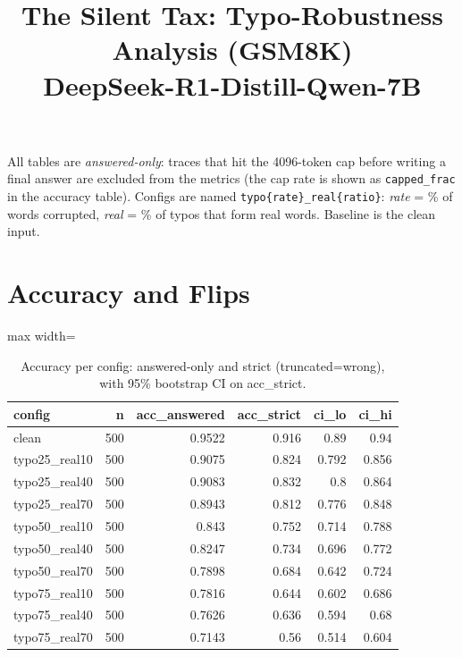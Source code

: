 \documentclass[11pt]{article}
\title{The Silent Tax: Typo-Robustness Analysis (GSM8K)\\\large DeepSeek-R1-Distill-Qwen-7B}
\date{}
\begin{document}
\maketitle
\noindent All tables are \emph{answered-only}: traces that hit the 4096-token cap before writing a final answer are excluded from the metrics (the cap rate is shown as \texttt{capped\_frac} in the accuracy table). Configs are named \texttt{typo\{rate\}\_real\{ratio\}}: \emph{rate} = \% of words corrupted, \emph{real} = \% of typos that form real words. Baseline is the clean input.

\section*{Accuracy and Flips}
\begin{table}[H]
\centering
\caption{Accuracy per config: answered-only and strict (truncated=wrong), with 95\% bootstrap CI on acc\_strict.}
\small
\begin{adjustbox}{max width=\textwidth}
\begin{tabular}{lrrrrr}
\toprule
\textbf{config} & \textbf{n} & \textbf{acc\_answered} & \textbf{acc\_strict} & \textbf{ci\_lo} & \textbf{ci\_hi} \\
\midrule
clean & 500 & 0.9522 & 0.916 & 0.89 & 0.94 \\
typo25\_real10 & 500 & 0.9075 & 0.824 & 0.792 & 0.856 \\
typo25\_real40 & 500 & 0.9083 & 0.832 & 0.8 & 0.864 \\
typo25\_real70 & 500 & 0.8943 & 0.812 & 0.776 & 0.848 \\
typo50\_real10 & 500 & 0.843 & 0.752 & 0.714 & 0.788 \\
typo50\_real40 & 500 & 0.8247 & 0.734 & 0.696 & 0.772 \\
typo50\_real70 & 500 & 0.7898 & 0.684 & 0.642 & 0.724 \\
typo75\_real10 & 500 & 0.7816 & 0.644 & 0.602 & 0.686 \\
typo75\_real40 & 500 & 0.7626 & 0.636 & 0.594 & 0.68 \\
typo75\_real70 & 500 & 0.7143 & 0.56 & 0.514 & 0.604 \\
\bottomrule
\end{tabular}
\end{adjustbox}
\end{table}
\end{document}
